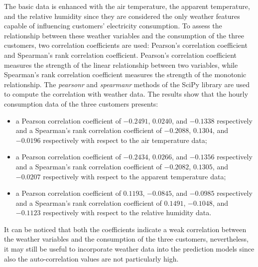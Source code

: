 The basic data is enhanced with the air temperature, the apparent temperature, and the relative humidity since they are considered the only weather features capable of influencing customers' electricity consumption.
To assess the relationship between these weather variables and the consumption of the three customers, two correlation coefficients are used: Pearson's correlation coefficient and Spearman's rank correlation coefficient.
Pearson's correlation coefficient measures the strength of the linear relationship between two variables, while Spearman's rank correlation coefficient measures the strength of the monotonic relationship.
The \emph{pearsonr} and \emph{spearmanr} methods of the SciPy library are used to compute the correlation with weather data.
The results show that the hourly consumption data of the three customers presents:
\begin{itemize}
  \item a Pearson correlation coefficient of $-0.2491$, $0.0240$, and $-0.1338$ respectively and a Spearman's rank correlation coefficient of $-0.2088$, $0.1304$, and $-0.0196$ respectively with respect to the air temperature data;
  \item a Pearson correlation coefficient of $-0.2434$, $0.0266$, and $-0.1356$ respectively and a Spearman's rank correlation coefficient of $-0.2082$, $0.1305$, and $-0.0207$ respectively with respect to the apparent temperature data;
  \item a Pearson correlation coefficient of $0.1193$, $-0.0845$, and $-0.0985$ respectively and a Spearman's rank correlation coefficient of $0.1491$, $-0.1048$, and $-0.1123$ respectively with respect to the relative humidity data.
\end{itemize}
It can be noticed that both the coefficients indicate a weak correlation between the weather variables and the consumption of the three customers, nevertheless, it may still be useful to incorporate weather data into the prediction models since also the auto-correlation values are not particularly high.

